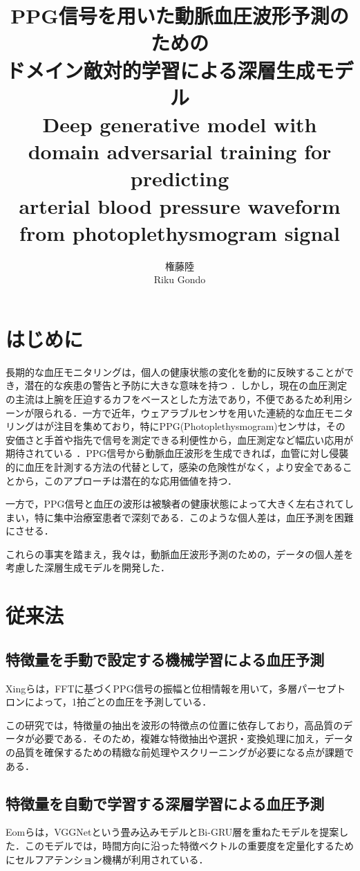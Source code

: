 \documentclass[twocolumn, a4paper]{ieicejsp}
\title{PPG信号を用いた動脈血圧波形予測のための \\ 
ドメイン敵対的学習による深層生成モデル
  {\normalsize \\ Deep generative model with domain adversarial training for predicting \\ arterial blood pressure waveform from photoplethysmogram signal}}
\author{
    権藤陸 \\ Riku Gondo
  }
\begin{document}
\maketitle

{\small
\section{はじめに}
長期的な血圧モニタリングは，個人の健康状態の変化を動的に反映することができ，潜在的な疾患の警告と予防に大きな意味を持つ\cite{intro1} \cite{intro2}．しかし，現在の血圧測定の主流は上腕を圧迫するカフをベースとした方法であり，不便であるため利用シーンが限られる．一方で近年，ウェアラブルセンサを用いた連続的な血圧モニタリングはが注目を集めており，特にPPG(Photoplethysmogram)センサは，その安価さと手首や指先で信号を測定できる利便性から，血圧測定など幅広い応用が期待されている\cite{intro3} \cite{intro4}．PPG信号から動脈血圧波形を生成できれば，血管に対し侵襲的に血圧を計測する方法の代替として，感染の危険性がなく，より安全であることから，このアプローチは潜在的な応用価値を持つ\cite{intro5}．

一方で，PPG信号と血圧の波形は被験者の健康状態によって大きく左右されてしまい，特に集中治療室患者で深刻である．このような個人差は，血圧予測を困難にさせる．

これらの事実を踏まえ，我々は，動脈血圧波形予測のための，データの個人差を考慮した深層生成モデルを開発した．

\vspace{-0.2cm}
\section{従来法}
\subsection{特徴量を手動で設定する機械学習による血圧予測}
Xingらは，FFTに基づくPPG信号の振幅と位相情報を用いて，多層パーセプトロンによって，1拍ごとの血圧を予測している\cite{ML}．

この研究では，特徴量の抽出を波形の特徴点の位置に依存しており，高品質のデータが必要である．そのため，複雑な特徴抽出や選択・変換処理に加え，データの品質を確保するための精緻な前処理やスクリーニングが必要になる点が課題である．

\vspace{-0.4cm}
\subsection{特徴量を自動で学習する深層学習による血圧予測}
Eomらは，VGGNetという畳み込みモデルとBi-GRU層を重ねたモデルを提案した．このモデルでは，時間方向に沿った特徴ベクトルの重要度を定量化するためにセルフアテンション機構が利用されている\cite{DL}．

}
\end{document}
